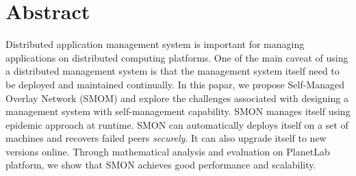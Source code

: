 \section*{Abstract}

Distributed application management system is important for
managing applications on distributed computing platforms. 
One of the main caveat of using a distributed management
system is that the management system itself need to be
deployed and maintained continually.  In this papar, we
propose Self-Managed Overlay Network (SMOM) and explore the
challenges associated with designing a management system
with self-management capability. SMON manages itself using
epidemic approach at runtime. SMON can automatically deploys
itself on a set of machines and recovers failed peers
\emph{securely}. It can also upgrade itself to new versions
online. Through mathematical analysis and evaluation on
PlanetLab platform, we show that SMON achieves good
performance and scalability.

